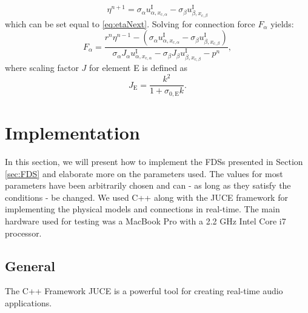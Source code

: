\documentclass{article}
\begin{document}
\begin{equation}
    \eta^{n+1} = \sigma_\alpha u_{\alpha,x_{\text{c},\alpha}}^\text{I} - \sigma_\beta u_{\beta,x_{\text{c},\beta}}^\text{I}
\end{equation}
which can be set equal to \eqref{eq:etaNext}. Solving for connection force $F_\alpha$ yields:
\begin{equation}
    F_\alpha = \frac{r^n\eta^{n-1}-(\sigma_\alpha u_{\alpha, x_{\text{c},\alpha}}^\text{I} - \sigma_\beta u_{\beta,x_{\text{c},\beta}}^\text{I})}{\sigma_\alpha J_\alpha u_{\alpha, x_{\text{c},\alpha}}^\text{I} - \sigma_\beta J_\beta u_{\beta,x_{\text{c},\beta}}^\text{I}-p^n},
\end{equation}
where scaling factor $J$ for element E is defined as
\begin{equation}
    J_\text{E} = \frac{k^2}{1+\sigma_{0,\text{E}}k}.
\end{equation}
\section{Implementation}\label{sec:implementation}
In this section, we will present how to implement the FDSs presented in Section \ref{sec:FDS} and elaborate more on the parameters used. The values for most parameters have been arbitrarily chosen and can - as long as they satisfy the conditions - be changed. We used C++ along with the JUCE framework \cite{JUCE2019} for implementing the physical models and connections in real-time. The main hardware used for testing was a MacBook Pro with a 2.2 GHz Intel Core i7 processor.

\subsection{General}
The C++ Framework JUCE is a powerful tool for creating real-time audio applications. 
\end{document}
